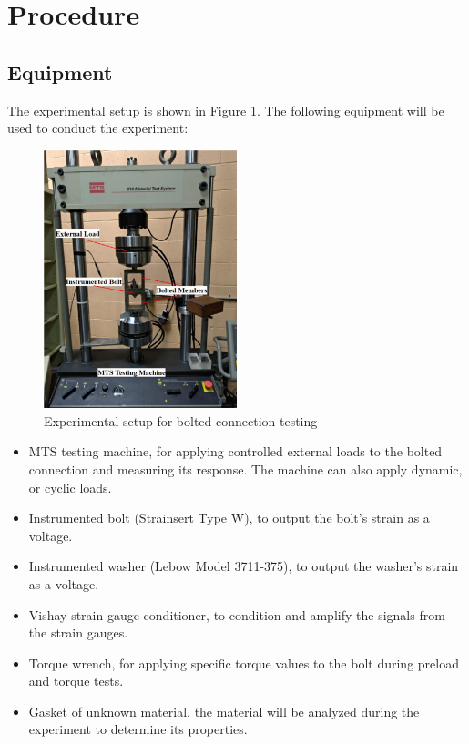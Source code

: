 \section{Procedure}
\label{sec:procedure}

\subsection{Equipment}
The experimental setup is shown in Figure \ref{fig:MTS Machine}. The following equipment will be used to conduct the experiment:
\begin{figure}[h]
    \centering
    \includegraphics[width=0.5\textwidth]{Sections/Figures/MTS Machine.png}
    \caption{Experimental setup for bolted connection testing}
    \label{fig:MTS Machine}
\end{figure}
\begin{itemize}
    \item MTS testing machine, for applying controlled external loads to the bolted connection and measuring its response. The machine can also apply dynamic, or cyclic loads. 
    \item Instrumented bolt (Strainsert Type W), to output the bolt's strain as a voltage.
    \item Instrumented washer (Lebow Model 3711-375), to output the washer's strain as a voltage.
    \item Vishay strain gauge conditioner, to condition and amplify the signals from the strain gauges. 
    \item Torque wrench, for applying specific torque values to the bolt during preload and torque tests.
    \item Gasket of unknown material, the material will be analyzed during the experiment to determine its properties.
\end{itemize}


